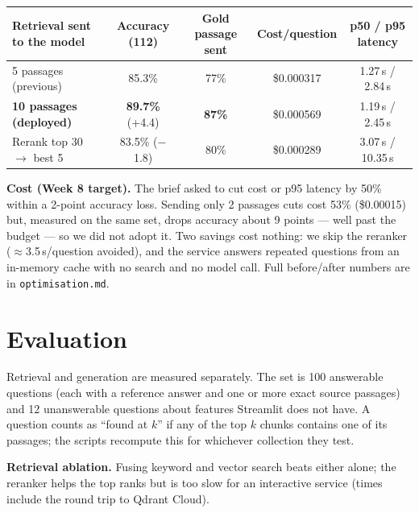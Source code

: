 \documentclass[10pt]{article}
\begin{document}
\begin{center}
\footnotesize
\begin{tabular}{@{}lcccc@{}}
\toprule
\textbf{Retrieval sent to the model} & \textbf{Accuracy (112)} & \textbf{Gold passage sent} & \textbf{Cost/question} & \textbf{p50 / p95 latency} \\
\midrule
5 passages (previous) & 85.3\% & 77\% & \$0.000317 & 1.27\,s / 2.84\,s \\
\textbf{10 passages (deployed)} & \textbf{89.7\%} (+4.4) & \textbf{87\%} & \$0.000569 & 1.19\,s / 2.45\,s \\
Rerank top 30 $\rightarrow$ best 5 & 83.5\% ($-$1.8) & 80\% & \$0.000289 & 3.07\,s / 10.35\,s \\
\bottomrule
\end{tabular}
\end{center}

\noindent\textbf{Cost (Week 8 target).} The brief asked to cut cost or p95 latency by 50\% within a 2-point accuracy loss.
Sending only 2 passages cuts cost 53\% (\$0.00015) but, measured on the same set, drops accuracy about 9 points --- well past
the budget --- so we did not adopt it. Two savings cost nothing: we skip the reranker ($\approx$3.5\,s/question avoided), and
the service answers repeated questions from an in-memory cache with no search and no model call. Full before/after numbers
are in \texttt{optimisation.md}.

\section{Evaluation}

Retrieval and generation are measured separately. The set is 100 answerable questions (each with a reference answer and one
or more exact source passages) and 12 unanswerable questions about features Streamlit does not have. A question counts as
``found at $k$'' if any of the top $k$ chunks contains one of its passages; the scripts recompute this for whichever
collection they test.

\noindent\textbf{Retrieval ablation.} Fusing keyword and vector search beats either alone; the reranker helps the top ranks
but is too slow for an interactive service (times include the round trip to Qdrant Cloud).
\end{document}
